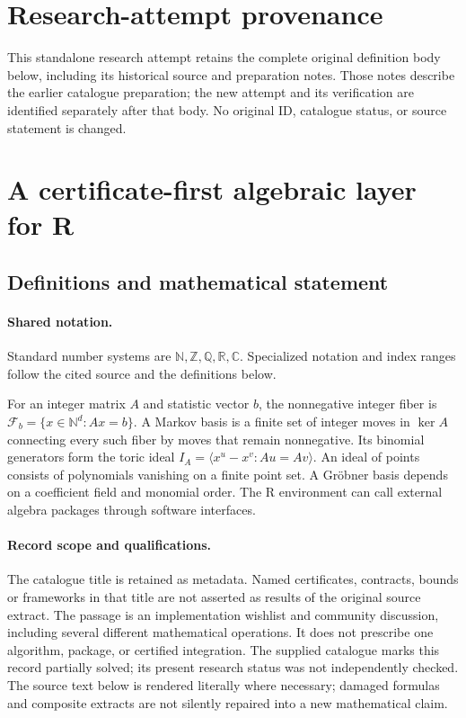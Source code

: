 \documentclass[11pt]{article}
\begin{document}
\section*{Research-attempt provenance}
This standalone research attempt retains the complete original definition body below,
including its historical source and preparation notes. Those notes describe the
earlier catalogue preparation; the new attempt and its verification are identified
separately after that body. No original ID, catalogue status, or source statement is changed.

\section{A certificate-first algebraic layer for R}\label{statement}

\subsection{Definitions and mathematical statement}

\paragraph{Shared notation.}Standard number systems are $\mathbb N,\mathbb Z,\mathbb Q,\mathbb R,\mathbb C$. Specialized notation and index ranges follow the cited source and the definitions below.


For an integer matrix $A$ and statistic vector $b$, the nonnegative integer fiber is $\mathcal F_b=\{x\in\mathbb N^d:Ax=b\}$. A Markov basis is a finite set of integer moves in $\ker A$ connecting every such fiber by moves that remain nonnegative. Its binomial generators form the toric ideal $I_A=\langle x^u-x^v:Au=Av\rangle$. An ideal of points consists of polynomials vanishing on a finite point set. A Gröbner basis depends on a coefficient field and monomial order. The R environment can call external algebra packages through software interfaces.
\paragraph{Record scope and qualifications.}
The catalogue title is retained as metadata. Named certificates, contracts, bounds or frameworks in that title are not asserted as results of the original source extract.
The passage is an implementation wishlist and community discussion, including several different mathematical operations. It does not prescribe one algorithm, package, or certified integration. The supplied catalogue marks this record partially solved; its present research status was not independently checked.
The source text below is rendered literally where necessary; damaged formulas and composite extracts are not silently repaired into a new mathematical claim.
\end{document}
